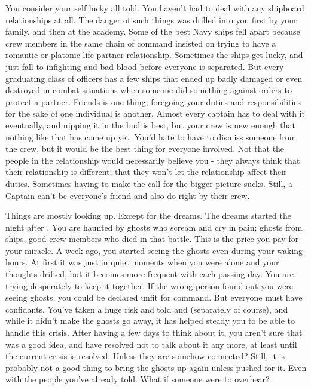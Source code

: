 \documentclass[char]{TMFHope}
\begin{document}
You consider your self lucky all told. You haven't had to deal with any shipboard relationships at all. The danger of such things was drilled into you first by your family, and then at the academy. Some of the best Navy ships fell apart because crew members in the same chain of command insisted on trying to have a romantic or platonic life partner relationship. Sometimes the ships get lucky, and just fall to infighting and bad blood before everyone is separated. But every graduating class of officers has a few ships that ended up badly damaged or even destroyed in combat situations when someone did something against orders to protect a partner. Friends is one thing; foregoing your duties and responsibilities for the sake of one individual is another. Almost every captain has to deal with it eventually, and nipping it in the bud is best, but your crew is new enough that nothing like that has come up yet. You'd hate to have to dismiss someone from the crew, but it would be the best thing for everyone involved. Not that the people in the relationship would necessarily believe you - they always think that their relationship is different; that they won't let the relationship affect their duties. Sometimes having to make the call for the bigger picture sucks. Still, a Captain can't be everyone's friend and also do right by their crew. 

Things are mostly looking up. Except for the dreams. The dreams started the night after \pBattle{}. You are haunted by ghosts who scream and cry in pain; ghosts from \pPlan{} ships, good crew members who died in that battle. This is the price you pay for your miracle.	A week ago, you started seeing the ghosts even during your waking hours. At first it was just in quiet moments when you were alone and your thoughts drifted, but it becomes more frequent with each passing day. You are trying desperately to keep it together. If the wrong person found out you were seeing ghosts, you could be declared unfit for command. But everyone must have confidants. You've taken a huge risk and told \cMed{} and \cSci{} (separately of course), and while it didn't make the ghosts go away, it has helped steady you to be able to handle this crisis. After having a few days to think about it, you aren't sure that was a good idea, and have resolved not to talk about it any more, at least until the current crisis is resolved. Unless they are somehow connected? Still, it is probably not a good thing to bring the ghosts up again unless pushed for it. Even with the people you've already told. What if someone were to overhear?
\end{document}
